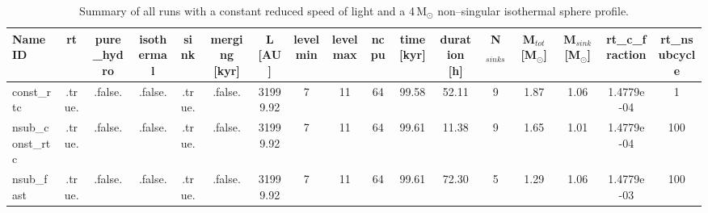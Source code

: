 \begin{table}
\begin{adjustbox}{width=1.8\textheight}
\begin{tabular}{lcccccccccccccccc}
\toprule
Name ID & rt & pure\_hydro & isothermal & sink & merging [kyr] & L [AU] & levelmin & levelmax & ncpu & time [kyr] & duration [h] & N$_{sinks}$ & M$_{tot}$ [M$_{\odot}$] & M$_{sink}$ [M$_{\odot}$] & rt\_c\_fraction & rt\_nsubcycle \\
\midrule
const\_rtc & .true. & .false. & .false. & .true. & .false. & 31999.92 & 7 & 11 & 64 & 99.58 & 52.11 & 9 & 1.87 & 1.06 & 1.4779e-04 & 1 \\
nsub\_const\_rtc & .true. & .false. & .false. & .true. & .false. & 31999.92 & 7 & 11 & 64 & 99.61 & 11.38 & 9 & 1.65 & 1.01 & 1.4779e-04 & 100 \\
nsub\_fast & .true. & .false. & .false. & .true. & .false. & 31999.92 & 7 & 11 & 64 & 99.61 & 72.30 & 5 & 1.29 & 1.06 & 1.4779e-03 & 100 \\
\bottomrule
\end{tabular}
\end{adjustbox}
\caption[Constant reduced speed of light runs]{Summary of all runs with a constant reduced speed of light and a 4\,M$_{\odot}$ non--singular isothermal sphere profile.}
\label{tab:const_rt}
\end{table}
